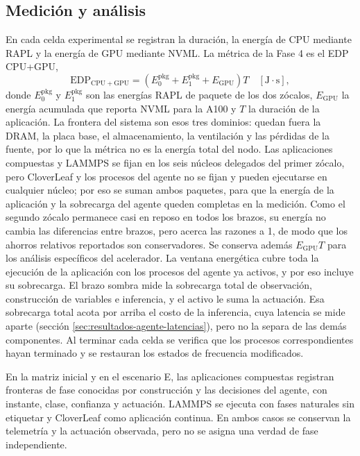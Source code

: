 \subsection{Medición y análisis}
\label{sec:metodologia-fase4-medicion}

En cada celda experimental se registran la duración, la energía de CPU mediante RAPL y la energía de GPU mediante NVML. La métrica de la Fase 4 es el EDP CPU+GPU,
\begin{equation}
\mathrm{EDP}_{\mathrm{CPU+GPU}}=\left(E^{\mathrm{pkg}}_{0}+E^{\mathrm{pkg}}_{1}+E_{\mathrm{GPU}}\right)T \quad [\mathrm{J\cdot s}],
\label{eq:edp-cpu-gpu}
\end{equation}
donde $E^{\mathrm{pkg}}_{0}$ y $E^{\mathrm{pkg}}_{1}$ son las energías RAPL de paquete de los dos zócalos, $E_{\mathrm{GPU}}$ la energía acumulada que reporta NVML para la A100 y $T$ la duración de la aplicación. La frontera del sistema son esos tres dominios: quedan fuera la DRAM, la placa base, el almacenamiento, la ventilación y las pérdidas de la fuente, por lo que la métrica no es la energía total del nodo. Las aplicaciones compuestas y LAMMPS se fijan en los seis núcleos delegados del primer zócalo, pero CloverLeaf y los procesos del agente no se fijan y pueden ejecutarse en cualquier núcleo; por eso se suman ambos paquetes, para que la energía de la aplicación y la sobrecarga del agente queden completas en la medición. Como el segundo zócalo permanece casi en reposo en todos los brazos, su energía no cambia las diferencias entre brazos, pero acerca las razones a 1, de modo que los ahorros relativos reportados son conservadores. Se conserva además $E_{\mathrm{GPU}}T$ para los análisis específicos del acelerador. La ventana energética cubre toda la ejecución de la aplicación con los procesos del agente ya activos, y por eso incluye su sobrecarga. El brazo sombra mide la sobrecarga total de observación, construcción de variables e inferencia, y el activo le suma la actuación. Esa sobrecarga total acota por arriba el costo de la inferencia, cuya latencia se mide aparte (sección \ref{sec:resultados-agente-latencias}), pero no la separa de las demás componentes. Al terminar cada celda se verifica que los procesos correspondientes hayan terminado y se restauran los estados de frecuencia modificados.

En la matriz inicial y en el escenario E, las aplicaciones compuestas registran fronteras de fase conocidas por construcción y las decisiones del agente, con instante, clase, confianza y actuación. LAMMPS se ejecuta con fases naturales sin etiquetar y CloverLeaf como aplicación continua. En ambos casos se conservan la telemetría y la actuación observada, pero no se asigna una verdad de fase independiente.

